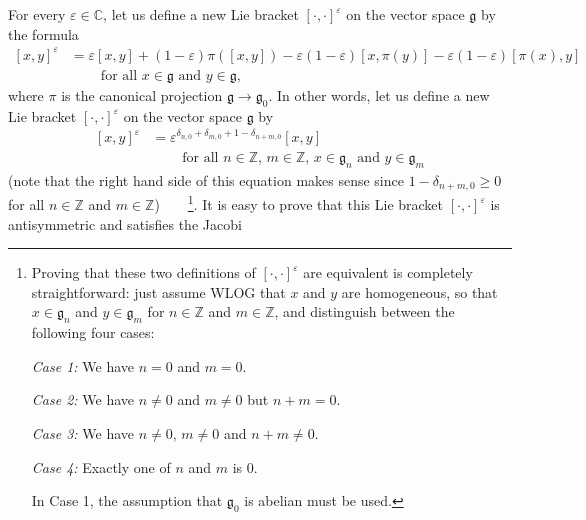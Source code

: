 \documentclass
[numbers=enddot,12pt,final,onecolumn,german,notitlepage]{scrartcl}%
\theoremstyle{definition}
\begin{document}
For every $\varepsilon\in\mathbb{C}$, let us define a new Lie bracket $\left[
\cdot,\cdot\right]  ^{\varepsilon}$ on the vector space $\mathfrak{g}$ by the
formula%
\begin{align}
\left[  x,y\right]  ^{\varepsilon}  &  =\varepsilon\left[  x,y\right]
+\left(  1-\varepsilon\right)  \pi\left(  \left[  x,y\right]  \right)
-\varepsilon\left(  1-\varepsilon\right)  \left[  x,\pi\left(  y\right)
\right]  -\varepsilon\left(  1-\varepsilon\right)  \left[  \pi\left(
x\right)  ,y\right] \label{pf.invformnondeg.g^epsi.1}\\
&  \ \ \ \ \ \ \ \ \ \ \text{for all }x\in\mathfrak{g}\text{ and }%
y\in\mathfrak{g},\nonumber
\end{align}
where $\pi$ is the canonical projection $\mathfrak{g}\rightarrow
\mathfrak{g}_{0}$. In other words, let us define a new Lie bracket $\left[
\cdot,\cdot\right]  ^{\varepsilon}$ on the vector space $\mathfrak{g}$ by%
\begin{align}
\left[  x,y\right]  ^{\varepsilon}  &  =\varepsilon^{\delta_{n,0}+\delta
_{m,0}+1-\delta_{n+m,0}}\left[  x,y\right]  \label{pf.invformnondeg.g^epsi.2}%
\\
&  \ \ \ \ \ \ \ \ \ \ \text{for all }n\in\mathbb{Z}\text{, }m\in
\mathbb{Z}\text{, }x\in\mathfrak{g}_{n}\text{ and }y\in\mathfrak{g}%
_{m}\nonumber
\end{align}
(note that the right hand side of this equation makes sense since
$1-\delta_{n+m,0}\geq0$ for all $n\in\mathbb{Z}$ and $m\in\mathbb{Z}%
$)\ \ \ \ \footnote{Proving that these two definitions of $\left[  \cdot
,\cdot\right]  ^{\varepsilon}$ are equivalent is completely straightforward:
just assume WLOG that $x$ and $y$ are homogeneous, so that $x\in
\mathfrak{g}_{n}$ and $y\in\mathfrak{g}_{m}$ for $n\in\mathbb{Z}$ and
$m\in\mathbb{Z}$, and distinguish between the following four cases:
\par
\textit{Case 1:} We have $n=0$ and $m=0$.
\par
\textit{Case 2:} We have $n\neq0$ and $m\neq0$ but $n+m=0$.
\par
\textit{Case 3:} We have $n\neq0$, $m\neq0$ and $n+m\neq0$.
\par
\textit{Case 4:} Exactly one of $n$ and $m$ is $0$.
\par
In Case 1, the assumption that $\mathfrak{g}_{0}$ is abelian must be used.}.
It is easy to prove that this Lie bracket $\left[  \cdot,\cdot\right]
^{\varepsilon}$ is antisymmetric and satisfies the Jacobi
\end{document}
